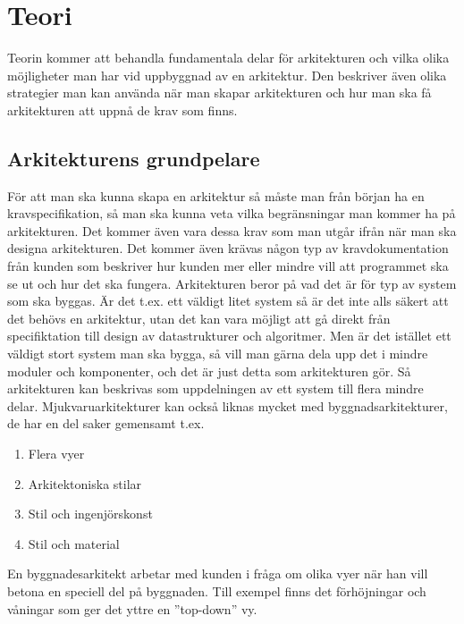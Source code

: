 \section{Teori}
Teorin kommer att behandla fundamentala delar för arkitekturen och vilka olika möjligheter man har vid uppbyggnad av en arkitektur. Den beskriver även olika strategier man kan använda när man skapar arkitekturen och hur man ska få arkitekturen att uppnå de krav som finns.

\subsection{Arkitekturens grundpelare}
För att man ska kunna skapa en arkitektur så måste man från början ha en kravspecifikation, så man ska kunna veta vilka begränsningar man kommer ha på arkitekturen. Det kommer även vara dessa krav som man utgår ifrån när man ska designa arkitekturen.
\newline
\newline
Det kommer även krävas någon typ av kravdokumentation från kunden som beskriver hur kunden mer eller mindre vill att programmet ska se ut och hur det ska fungera. 
\newline
\newline
Arkitekturen beror på vad det är för typ av system som ska byggas. Är det t.ex. ett väldigt litet system så är det inte alls säkert att det behövs en arkitektur, utan det kan vara möjligt att gå direkt från specifiktation till design av datastrukturer och algoritmer. Men är det istället ett väldigt stort system man ska bygga, så vill man gärna dela upp det i mindre moduler och komponenter, och det är just detta som arkitekturen gör. Så arkitekturen kan beskrivas som uppdelningen av ett system till flera mindre delar. \cite[s. 223]{set}
\newline
\newline
Mjukvaruarkitekturer kan också liknas mycket med byggnadsarkitekturer, de har en del saker gemensamt t.ex. 
\begin{enumerate}
	\item Flera vyer
	\item Arkitektoniska stilar
	\item Stil och ingenjörskonst
	\item Stil och material
\end{enumerate}
En byggnadesarkitekt arbetar med kunden i fråga om olika vyer när han vill betona en speciell del på byggnaden. Till exempel finns det förhöjningar och våningar som ger det yttre en ''top-down'' vy. \citep{perry92}

